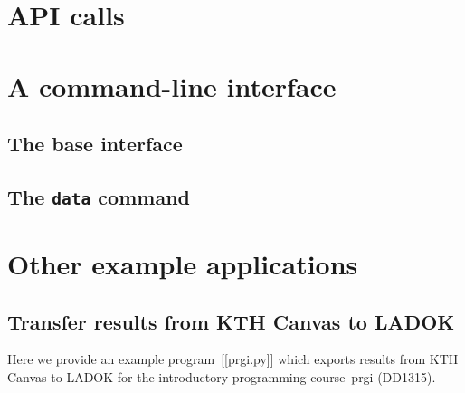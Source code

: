 \documentclass[a4paper]{report}
\begin{document}
\part{API calls}





\part{A command-line interface}

\chapter{The base interface}




\chapter{The \texttt{data} command}





\part{Other example applications}

\chapter{Transfer results from KTH Canvas to LADOK}

Here we provide an example program~[[prgi.py]] which exports results from KTH 
Canvas to LADOK for the introductory programming course~prgi (DD1315).




\printbibliography
\end{document}
